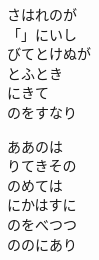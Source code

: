 \documentclass[10pt,b5j]{tarticle} %
\begin{document}
\begin{enumerate}
\begin{minipage}[c]{\blocksize}
        \vspace{\linespace}
        \item
        さはれのが\\
        「」にいし\\
        びてとけぬが\\
        とふとき\\
        にきて\\
        のをすなり
        
        \vspace{\linespace}
        \item
        ああのは\\
        りてきその\\
        のめては\\
        にかはすに\\
        のをべつつ\\
        ののにあり
    
    \end{minipage}
\end{enumerate} %
\end{document}

